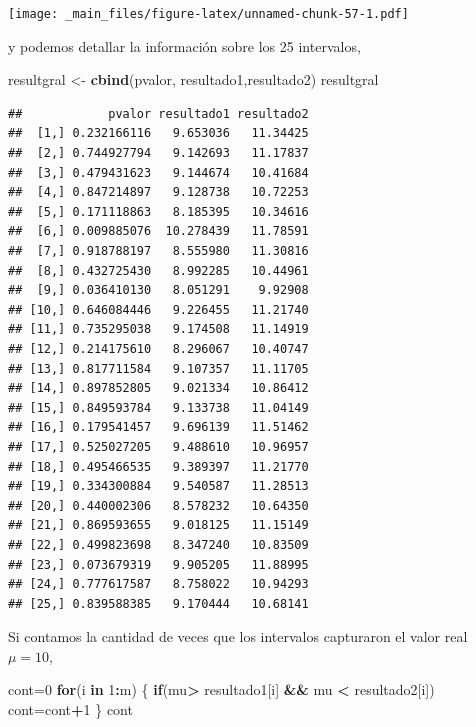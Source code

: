 \documentclass[
]{book}
\newenvironment{Shaded}{\begin{snugshade}}{\end{snugshade}}
\newcommand{\ControlFlowTok}[1]{\textcolor[rgb]{0.13,0.29,0.53}{\textbf{#1}}}
\newcommand{\DecValTok}[1]{\textcolor[rgb]{0.00,0.00,0.81}{#1}}
\newcommand{\FunctionTok}[1]{\textcolor[rgb]{0.13,0.29,0.53}{\textbf{#1}}}
\newcommand{\NormalTok}[1]{#1}
\newcommand{\OtherTok}[1]{\textcolor[rgb]{0.56,0.35,0.01}{#1}}
\newcommand{\SpecialCharTok}[1]{\textcolor[rgb]{0.81,0.36,0.00}{\textbf{#1}}}
\begin{document}
\texttt{[image: \_main\_files/figure-latex/unnamed-chunk-57-1.pdf]}

y podemos detallar la información sobre los 25 intervalos,

\begin{Shaded}
\begin{Highlighting}[]
\NormalTok{resultgral }\OtherTok{\textless{}{-}} \FunctionTok{cbind}\NormalTok{(pvalor, resultado1,resultado2)}
\NormalTok{resultgral}
\end{Highlighting}
\end{Shaded}

\begin{verbatim}
##            pvalor resultado1 resultado2
##  [1,] 0.232166116   9.653036   11.34425
##  [2,] 0.744927794   9.142693   11.17837
##  [3,] 0.479431623   9.144674   10.41684
##  [4,] 0.847214897   9.128738   10.72253
##  [5,] 0.171118863   8.185395   10.34616
##  [6,] 0.009885076  10.278439   11.78591
##  [7,] 0.918788197   8.555980   11.30816
##  [8,] 0.432725430   8.992285   10.44961
##  [9,] 0.036410130   8.051291    9.92908
## [10,] 0.646084446   9.226455   11.21740
## [11,] 0.735295038   9.174508   11.14919
## [12,] 0.214175610   8.296067   10.40747
## [13,] 0.817711584   9.107357   11.11705
## [14,] 0.897852805   9.021334   10.86412
## [15,] 0.849593784   9.133738   11.04149
## [16,] 0.179541457   9.696139   11.51462
## [17,] 0.525027205   9.488610   10.96957
## [18,] 0.495466535   9.389397   11.21770
## [19,] 0.334300884   9.540587   11.28513
## [20,] 0.440002306   8.578232   10.64350
## [21,] 0.869593655   9.018125   11.15149
## [22,] 0.499823698   8.347240   10.83509
## [23,] 0.073679319   9.905205   11.88995
## [24,] 0.777617587   8.758022   10.94293
## [25,] 0.839588385   9.170444   10.68141
\end{verbatim}

Si contamos la cantidad de veces que los intervalos capturaron el valor real \(\mu=10\),

\begin{Shaded}
\begin{Highlighting}[]
\NormalTok{cont}\OtherTok{=}\DecValTok{0}
\ControlFlowTok{for}\NormalTok{(i }\ControlFlowTok{in} \DecValTok{1}\SpecialCharTok{:}\NormalTok{m)}
\NormalTok{\{}
  \ControlFlowTok{if}\NormalTok{(mu}\SpecialCharTok{\textgreater{}}\NormalTok{ resultado1[i] }\SpecialCharTok{\&\&}\NormalTok{ mu }\SpecialCharTok{\textless{}}\NormalTok{ resultado2[i])}
\NormalTok{    cont}\OtherTok{=}\NormalTok{cont}\SpecialCharTok{+}\DecValTok{1}
\NormalTok{\}}
\NormalTok{cont}
\end{Highlighting}
\end{Shaded}
\end{document}
